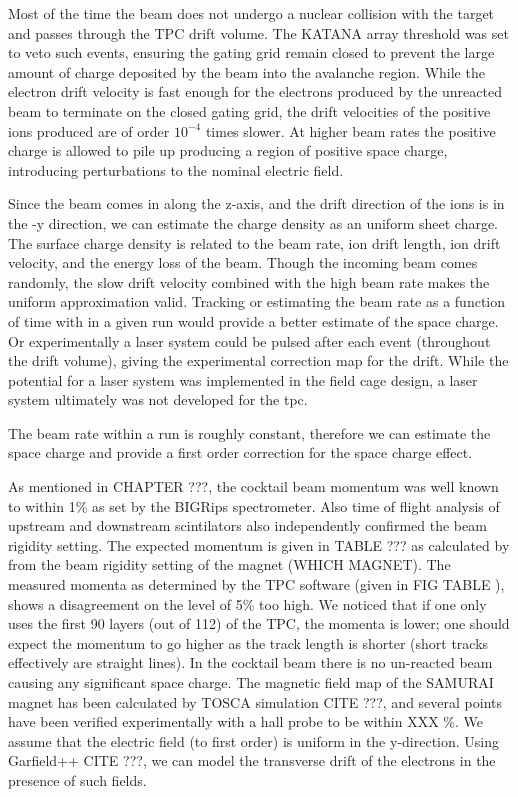 Most of the time the beam does not undergo a nuclear collision with the target and passes through the TPC drift volume. The KATANA array threshold was set to veto such events, ensuring the gating grid remain closed to prevent the large amount of charge deposited by the beam into the avalanche region. While the electron drift velocity is fast enough for the electrons produced by the unreacted beam to terminate on the closed gating grid, the drift velocities of the positive ions produced are of order $10^{-4}$ times slower. At higher beam rates the positive charge is allowed to pile up producing a region of positive space charge, introducing perturbations to the nominal electric field. 

Since the beam comes in along the z-axis, and the drift direction of the ions is in the -y direction, we can estimate the charge density as an uniform sheet charge. The surface charge density is related to the beam rate, ion drift length, ion drift velocity, and the energy loss of the beam. Though the incoming beam comes randomly, the slow drift velocity combined with the high beam rate makes the uniform approximation valid. Tracking or estimating the beam rate as a function of time with in a given run would provide a better estimate of the space charge. Or experimentally a laser system could be pulsed after each event (throughout the drift volume), giving the experimental correction map for the drift. While the potential for a laser system was implemented in the field cage design, a laser system ultimately was not developed for the \spirit tpc. 

The beam rate within a run is roughly constant, therefore we can estimate the space charge and provide a first order correction for the space charge effect. 

As mentioned in CHAPTER ???, the cocktail beam momentum was well known to within 1\% as set by the BIGRips spectrometer. Also time of flight analysis of upstream and downstream scintilators also independently confirmed the beam rigidity setting. The expected momentum is given in TABLE ??? as calculated by from the beam rigidity setting of the magnet (WHICH MAGNET). The measured momenta as determined by the TPC software (given in FIG TABLE ), shows a disagreement on the level of 5\% too high. We noticed that if one only uses the first 90 layers (out of 112) of the TPC, the momenta is lower; one should expect the momentum to go higher as the track length is shorter (short tracks effectively are straight lines). 
In the cocktail beam there is no un-reacted beam causing any significant space charge. The magnetic field map of the SAMURAI magnet has been calculated by TOSCA simulation CITE ???, and several points have been verified experimentally with a hall probe to be within XXX \%. We assume that the electric field (to first order) is uniform in the y-direction. Using Garfield++ CITE ???, we can model the transverse drift of the electrons in the presence of such fields. 


